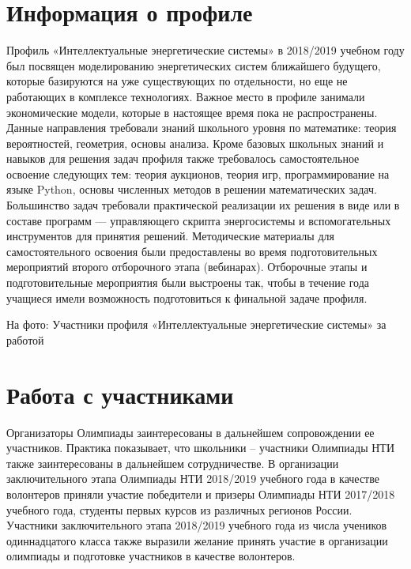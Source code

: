 \section*{Информация о профиле}

Профиль «Интеллектуальные энергетические системы» в 2018/2019 учебном году был посвящен моделированию энергетических систем ближайшего будущего, которые базируются на уже существующих по отдельности, но еще не работающих в комплексе технологиях. Важное место в профиле занимали экономические модели, которые в настоящее время пока не распространены. Данные направления требовали знаний школьного уровня по математике: теория вероятностей, геометрия, основы анализа. Кроме базовых школьных знаний и навыков для решения задач профиля также требовалось самостоятельное освоение следующих тем: теория аукционов, теория игр, программирование на языке Python, основы численных методов в решении математических задач. Большинство задач требовали практической реализации их решения в виде или в составе программ — управляющего скрипта энергосистемы и вспомогательных инструментов для принятия решений. Методические материалы для самостоятельного освоения были предоставлены во время подготовительных мероприятий второго отборочного этапа (вебинарах). Отборочные этапы и подготовительные мероприятия были выстроены так, чтобы в течение года учащиеся имели возможность подготовиться к финальной задаче профиля.


\begin{center}
    На фото: Участники профиля «Интеллектуальные энергетические системы» за работой
\end{center}

\section*{Работа с участниками}

Организаторы Олимпиады заинтересованы в дальнейшем сопровождении ее участников. Практика показывает, что школьники  –  участники Олимпиады НТИ также заинтересованы в дальнейшем сотрудничестве. В организации заключительного этапа Олимпиады НТИ 2018/2019 учебного года в качестве волонтеров приняли участие победители и призеры Олимпиады НТИ 2017/2018 учебного года, студенты первых курсов из различных регионов России. Участники заключительного этапа 2018/2019 учебного года из числа учеников одиннадцатого класса также выразили желание принять участие в организации олимпиады и подготовке участников в качестве волонтеров.  

